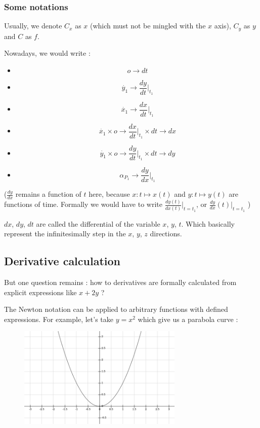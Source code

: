 \documentclass[12pt]{article}
\begin{document}
\subsubsection{Some notations}

Usually, we denote $C_x$ as $x$ (which must not be mingled with the $x$ axis), $C_y$ as $y$ and $C$ as $f$.

\bigskip

Nowadays, we would write :

\begin{itemize}
\item $$ o \rightarrow dt $$
\item $$ \dot{y_1} \rightarrow \frac{dy}{dt}|_{t_1} $$
\item $$ \dot{x_1} \rightarrow \frac{dx}{dt}|_{t_1} $$
\item $$ \dot{x_1} \times o \rightarrow \frac{dx}{dt}|_{t_1} \times dt  \rightarrow dx $$
\item $$ \dot{y_1} \times o \rightarrow \frac{dy}{dt}|_{t_1} \times dt  \rightarrow dy $$
\item $$ \alpha_{P_1} \rightarrow \frac{dy}{dx}|_{t_1} $$ 
\end{itemize}

($\frac{dy}{dx}$ remains a function of $t$ here, because $x: t \mapsto x(t)$ and $y: t \mapsto y(t)$ are functions of time. Formally we would have to write $\frac{dy(t)}{dx(t)}|_{t=t_1}$, or $\frac{dy}{dx}(t)|_{t=t_1}$ )

$dx$, $dy$, $dt$ are called the differential of the variable $x$, $y$, $t$. Which basically represent the infinitesimally step \cite{stackexchange_what_is_dx_integration} in the $x$, $y$, $z$ directions. 


\subsection{Derivative calculation}


But one question remains : how to derivatives are formally calculated from explicit expressions like $x + 2y$ ?

The Newton notation can be applied to arbitrary functions with defined expressions. For example, let's take $y = x^2$ which give us a parabola curve :

\begin{figure}[H]
\centering
\includegraphics[width=0.7\textwidth]{assets/images/SHTIxCkjCR.png}
\end{figure}
\end{document}
